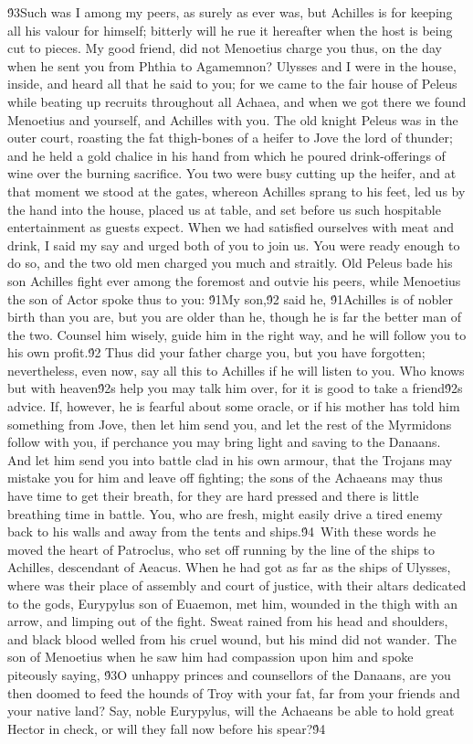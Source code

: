 {\'93Such was I among my peers, as surely as ever was, but Achilles is for keeping all his valour for himself; bitterly will he rue it hereafter when the host is being cut to pieces. My good friend, did not Menoetius charge you thus, on the day when he sent you from Phthia to Agamemnon? Ulysses and I were in the house, inside, and heard all that he said to you; for we came to the fair house of Peleus while beating up recruits throughout all Achaea, and when we got there we found Menoetius and yourself, and Achilles with you. The old knight Peleus was in the outer court, roasting the fat thigh-bones of a heifer to Jove the lord of thunder; and he held a gold chalice in his hand from which he poured drink-offerings of wine over the burning sacrifice. You two were busy cutting up the heifer, and at that moment we stood at the gates, whereon Achilles sprang to his feet, led us by the hand into the house, placed us at table, and set before us such hospitable entertainment as guests expect. When we had satisfied ourselves with meat and drink, I said my say and urged both of you to join us. You were ready enough to do so, and the two old men charged you much and straitly. Old Peleus bade his son Achilles fight ever among the foremost and outvie his peers, while Menoetius the son of Actor spoke thus to you: \'91My son,\'92 said he, \'91Achilles is of nobler birth than you are, but you are older than he, though he is far the better man of the two. Counsel him wisely, guide him in the right way, and he will follow you to his own profit.\'92 Thus did your father charge you, but you have forgotten; nevertheless, even now, say all this to Achilles if he will listen to you. Who knows but with heaven\'92s help you may talk him over, for it is good to take a friend\'92s advice. If, however, he is fearful about some oracle, or if his mother has told him something from Jove, then let him send you, and let the rest of the Myrmidons follow with you, if perchance you may bring light and saving to the Danaans. And let him send you into battle clad in his own armour, that the Trojans may mistake you for him and leave off fighting; the sons of the Achaeans may thus have time to get their breath, for they are hard pressed and there is little breathing time in battle. You, who are fresh, might easily drive a tired enemy back to his walls and away from the tents and ships.\'94\
With these words he moved the heart of Patroclus, who set off running by the line of the ships to Achilles, descendant of Aeacus. When he had got as far as the ships of Ulysses, where was their place of assembly and court of justice, with their altars dedicated to the gods, Eurypylus son of Euaemon, met him, wounded in the thigh with an arrow, and limping out of the fight. Sweat rained from his head and shoulders, and black blood welled from his cruel wound, but his mind did not wander. The son of Menoetius when he saw him had compassion upon him and spoke piteously saying, \'93O unhappy princes and counsellors of the Danaans, are you then doomed to feed the hounds of Troy with your fat, far from your friends and your native land? Say, noble Eurypylus, will the Achaeans be able to hold great Hector in check, or will they fall now before his spear?\'94\
}
